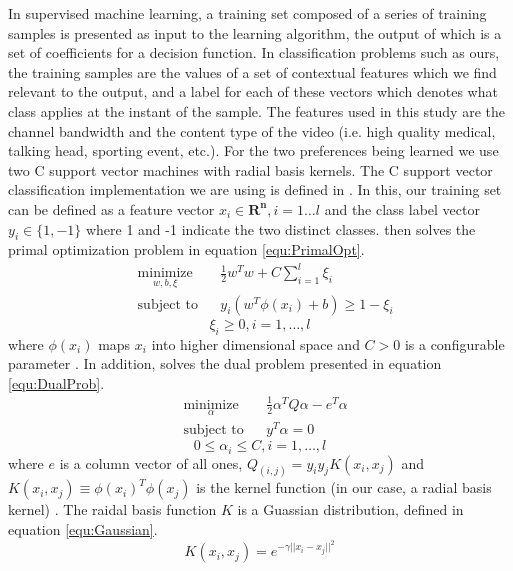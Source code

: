 \documentclass[a4paper,12pt]{article}
\begin{document}
In supervised machine learning, a training set composed of a series of training samples is presented as input to the learning algorithm, the output of which is a set of coefficients for a decision function. In classification problems such as ours, the training samples are the values of a set of contextual features which we find relevant to the output, and a label for each of these vectors which denotes what class applies at the instant of the sample. The features used in this study are the channel bandwidth and the content type of the video (i.e. high quality medical, talking head, sporting event, etc.). For the two preferences being learned we use two C support vector machines with radial basis kernels. The C support vector classification implementation we are using is defined in \cite{LibSVM}. In this, our training set can be defined as a feature vector $x_i \in \mathbf{R^n}  ,i=1\ldots{l}$ and the class label vector $y_i \in \lbrace 1,-1 \rbrace $ where 1 and -1 indicate the two distinct classes. \cite{LibSVM} then solves the primal optimization problem in equation \ref{equ:PrimalOpt}. 
\begin{equation}
\begin{aligned}
\label{equ:PrimalOpt}
& \underset{w,b,\xi}{\text{minimize}}
& & \frac{1}{2}w^Tw+C\sum_{i=1}^{l} \xi_i \\
& \text{subject to}
& &  y_i(w^T\phi(x_i) + b) \ge 1 - \xi_i
\end{aligned}
\end{equation}
\[ \xi_i \ge 0, i = 1,\ldots ,l \]
where $\phi (x_i)$ maps $x_i$ into higher dimensional space and $C > 0$ is a configurable parameter \cite{LibSVM}. In addition, \cite{LibSVM} solves the dual problem presented in equation \ref{equ:DualProb}.
\begin{equation}
\begin{aligned}
\label{equ:DualProb}
& \underset{\alpha}{\text{minimize}}
& & \frac{1}{2}\alpha^TQ\alpha-e^T\alpha \\
& \text{subject to}
& &  y^T\alpha = 0
\end{aligned}
\end{equation}
\[ 0 \le \alpha_i \le C, i = 1,\ldots ,l \]
where $e$ is a column vector of all ones, $Q_(i,j)=y_i y_j K(x_i,x_j)$ and $K(x_i,x_j ) \equiv \phi (x_i )^T \phi (x_j)$ is the kernel function (in our case, a radial basis kernel) \cite{LibSVM}. The raidal basis function $K$ is a Guassian distribution, defined in equation \ref{equ:Gaussian}.
\begin{equation}
\label{equ:Gaussian}
K(x_i, x_j) = e^{-\gamma ||x_i - x_j||^{2}}
\end{equation}
\end{document}
